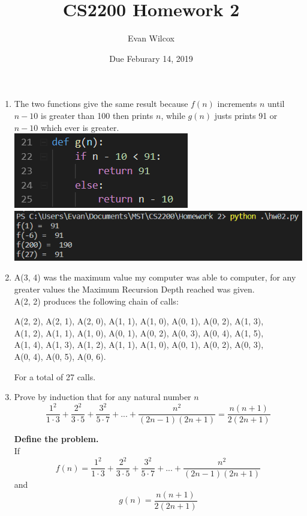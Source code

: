\documentclass[a4paper]{article}
\title{CS2200 Homework 2}
\author{Evan Wilcox}
\date{Due Feburary 14, 2019}
\begin{document}
    \maketitle

    \begin{enumerate}

    \item 
    The two functions give the same result because $f(n)$ increments $n$ until $n-10$
    is greater than 100 then prints $n$, while $g(n)$ justs prints 91 or $n-10$ which 
    ever is greater.\\
    
    \includegraphics[scale=0.6]{1a} \\
    \includegraphics[scale=0.6]{1b}

    \item 
    A(3, 4) was the maximum value my computer was able to computer, for any greater
    values the Maximum Recursion Depth reached was given. \\ 
    A(2, 2) produces the following chain of calls: 
    
    A(2, 2), A(2, 1), A(2, 0), A(1, 1), A(1, 0), A(0, 1), A(0, 2), A(1, 3), \\ A(1, 2), 
    A(1, 1), A(1, 0), A(0, 1), A(0, 2), A(0, 3), A(0, 4), A(1, 5), \\ A(1, 4), A(1, 3),
    A(1, 2), A(1, 1), A(1, 0), A(0, 1), A(0, 2), A(0, 3), \\ A(0, 4), A(0, 5), A(0, 6).
    
    For a total of 27 calls.
    
    \newpage
    \item 
    Prove by induction that for any natural number $n$
    $$\frac{1^{2}}{1\cdot3} + \frac{2^{2}}{3\cdot5} + \frac{3^{2}}{5\cdot7} + ... + \frac{n^{2}}{(2n-1)(2n+1)} = \frac{n(n+1)}{2(2n+1)}$$


    \textbf{Define the problem.} \\
    If $$f(n) = \frac{1^{2}}{1\cdot3} + \frac{2^{2}}{3\cdot5} + \frac{3^{2}}{5\cdot7} + ... + \frac{n^{2}}{(2n-1)(2n+1)}$$
    and $$g(n) = \frac{n(n+1)}{2(2n+1)}$$


\end{enumerate}
\end{document}
